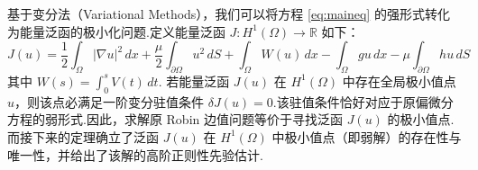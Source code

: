 基于变分法（Variational Methods），我们可以将方程 \eqref{eq:maineq} 的强形式转化为能量泛函的极小化问题.定义能量泛函 $J: H^1(\Omega) \to \mathbb{R}$ 如下：
\begin{equation}\label{eq:ch3loss}
J(u) = \frac{1}{2}\int_{\Omega} |\nabla u|^2 \, dx + \frac{\mu}{2}\int_{\partial \Omega} u^2 \, dS + \int_{\Omega} W(u) \, dx - \int_{\Omega} gu \, dx - \mu \int_{\partial \Omega} hu \, dS
\end{equation}
其中 $W(s) = \int_0^s V(t) \, dt$.
若能量泛函 $J(u)$ 在 $H^1(\Omega)$ 中存在全局极小值点 $u$，则该点必满足一阶变分驻值条件 $\delta J(u) = 0$.该驻值条件恰好对应于原偏微分方程的弱形式.因此，求解原 Robin 边值问题等价于寻找泛函 $J(u)$ 的极小值点.而接下来的定理确立了泛函 $J(u)$ 在 $H^1(\Omega)$ 中极小值点（即弱解）的存在性与唯一性，并给出了该解的高阶正则性先验估计.

